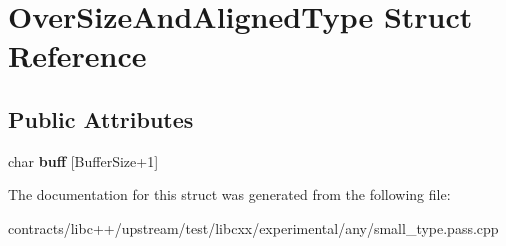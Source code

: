 \hypertarget{struct_over_size_and_aligned_type}{}\section{Over\+Size\+And\+Aligned\+Type Struct Reference}
\label{struct_over_size_and_aligned_type}
\subsection*{Public Attributes}
\begin{DoxyCompactItemize}
\item 
\mbox{\label{struct_over_size_and_aligned_type_a50738bd64b641ade44307f0e9fff2e60}} 
char {\bfseries buff} \mbox{[}Buffer\+Size+1\mbox{]}
\end{DoxyCompactItemize}


The documentation for this struct was generated from the following file\+:\begin{DoxyCompactItemize}
\item 
contracts/libc++/upstream/test/libcxx/experimental/any/small\+\_\+type.\+pass.\+cpp\end{DoxyCompactItemize}
